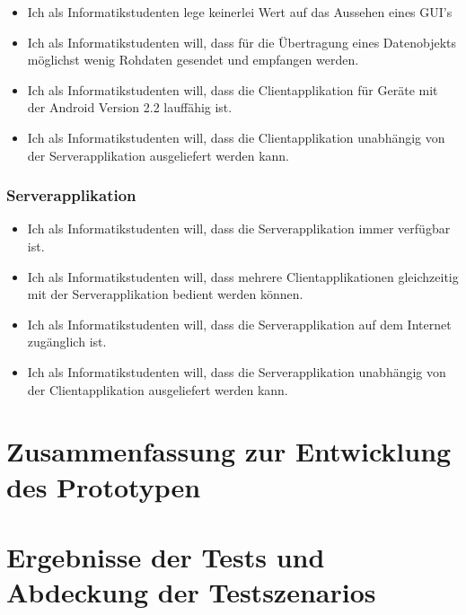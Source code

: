 \documentclass[listof=totocnumbered, bibliography=totocnumbered]{scrreprt}
\begin{document}
  \begin{itemize}
    \item Ich als Informatikstudenten lege keinerlei Wert auf das Aussehen
    eines \ac{GUI}'s
    \item Ich als Informatikstudenten will, dass für die Übertragung eines
    Datenobjekts möglichst wenig Rohdaten gesendet und empfangen werden.
    \item Ich als Informatikstudenten will, dass die Clientapplikation für
    Geräte mit der Android Version 2.2 lauffähig ist.
    \item Ich als Informatikstudenten will, dass die Clientapplikation
    unabhängig von der Serverapplikation ausgeliefert werden kann.
  \end{itemize}
  
  \subsubsection{Serverapplikation}
  
  \begin{itemize}
    \item Ich als Informatikstudenten will, dass die Serverapplikation immer
    verfügbar ist.
    \item Ich als Informatikstudenten will, dass mehrere Clientapplikationen
    gleichzeitig mit der Serverapplikation bedient werden können.
    \item Ich als Informatikstudenten will, dass die Serverapplikation
    auf dem Internet zugänglich ist.
    \item Ich als Informatikstudenten will, dass die Serverapplikation
    unabhängig von der Clientapplikation ausgeliefert werden kann.
  \end{itemize}
  
  
  \newpage
  
  \section{Zusammenfassung zur Entwicklung des Prototypen}
  
  
  \newpage
  
  \section{Ergebnisse der Tests und Abdeckung der Testszenarios}
  
  
  
\end{document}
